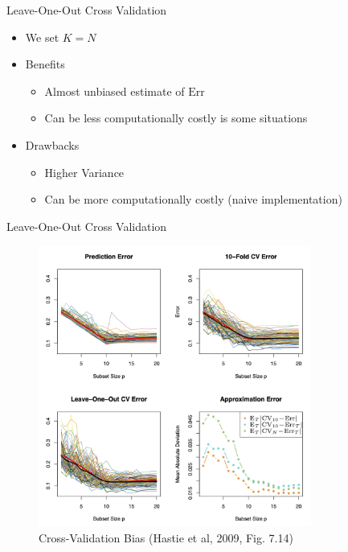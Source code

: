 \documentclass[10pt,handout]{beamer}
\begin{document}
\begin{frame}{Leave-One-Out Cross Validation}

\begin{itemize}
\item We set $K=N$
\item Benefits
\begin{itemize}
\item Almost unbiased estimate of $\text{Err}$
\item Can be less computationally costly is some situations
\end{itemize}
\item Drawbacks
\begin{itemize}
\item Higher Variance
\item Can be more computationally costly (naive implementation)
\end{itemize}
\end{itemize}

\end{frame}


\begin{frame}{Leave-One-Out Cross Validation}

\begin{figure}[h]
\caption{Cross-Validation Bias (Hastie et al, 2009, Fig. 7.14)}
\centering
\includegraphics[width=0.8\textwidth]{figs/ESL_7_14.png}
\end{figure}

\end{frame}
\end{document}
